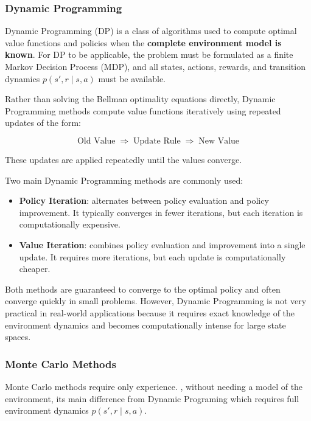 \subsubsection{Dynamic Programming}

Dynamic Programming (DP) is a class of algorithms used to compute optimal value functions and policies when the \textbf{complete environment model is known}. For DP to be applicable, the problem must be formulated as a finite Markov Decision Process (MDP), and all states, actions, rewards, and transition dynamics $p(s', r \mid s, a)$ must be available.

Rather than solving the Bellman optimality equations directly, Dynamic Programming methods compute value functions iteratively using repeated updates of the form:

\[
\text{Old Value} \;\Rightarrow\; \text{Update Rule} \;\Rightarrow\; \text{New Value}
\]

These updates are applied repeatedly until the values converge.

Two main Dynamic Programming methods are commonly used:

\begin{itemize}

  \item \textbf{Policy Iteration}: alternates between policy evaluation and policy improvement. It typically converges in fewer iterations, but each iteration is computationally expensive.

  \item \textbf{Value Iteration}: combines policy evaluation and improvement into a single update. It requires more iterations, but each update is computationally cheaper.

\end{itemize}

Both methods are guaranteed to converge to the optimal policy and often converge quickly in small problems. However, Dynamic Programming is not very practical in real-world applications because it requires exact knowledge of the environment dynamics and becomes computationally intense for large state spaces.


\subsubsection{Monte Carlo Methods}

Monte Carlo methods require only experience. \cite{sutton}, without needing a model of the environment, its main difference from Dynamic Programing which requires full environment dynamics $p(s', r \mid s, a)$. 




